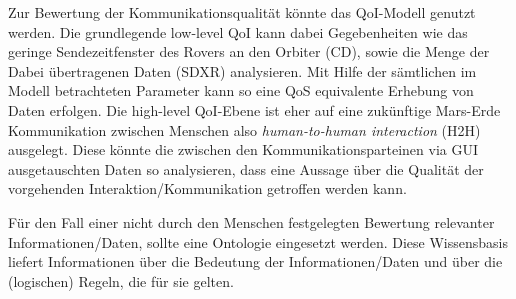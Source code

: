 Zur Bewertung der Kommunikationsqualit{\"a}t k{\"o}nnte das QoI-Modell genutzt
werden. Die grundlegende low-level QoI kann dabei Gegebenheiten wie das geringe
Sendezeitfenster des Rovers an den Orbiter (CD), sowie die Menge der Dabei
{\"u}bertragenen Daten (SDXR) analysieren. Mit Hilfe der s{\"a}mtlichen im
Modell betrachteten Parameter kann so eine QoS equivalente Erhebung von
Daten erfolgen. Die high-level QoI-Ebene ist eher auf eine zuk{\"u}nftige
Mars-Erde Kommunikation zwischen Menschen also \textit{human-to-human
interaction} (H2H) ausgelegt. Diese k{\"o}nnte die zwischen den
Kommunikationsparteinen via GUI ausgetauschten Daten so analysieren, dass eine
Aussage {\"u}ber die Qualit{\"a}t der vorgehenden Interaktion/Kommunikation
getroffen werden kann.

F{\"u}r den Fall einer nicht durch den Menschen festgelegten Bewertung
relevanter Informationen/Daten, sollte eine Ontologie eingesetzt werden. Diese
Wissensbasis liefert Informationen {\"u}ber die Bedeutung der
Informationen/Daten und {\"u}ber die (logischen) Regeln, die f{\"u}r sie gelten.
